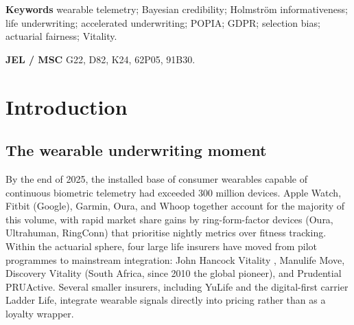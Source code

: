 \documentclass[11pt,a4paper]{article}
\let\origsection\section
\renewcommand{\section}{\clearpage\origsection}
\theoremstyle{ia}
\newcommand{\1}{\mathbf{1}}
\begin{document}
\par\vspace{4pt}\noindent{\color{iarule}\rule{\textwidth}{0.3pt}}\par\vspace{6pt}

\noindent
{\sffamily\footnotesize\color{iadark}\textbf{Keywords}}\quad
{\footnotesize wearable telemetry; Bayesian credibility; Holmstr\"om
informativeness; life underwriting; accelerated underwriting; POPIA;
GDPR; selection bias; actuarial fairness; Vitality.}

\par\vspace{3pt}
\noindent
{\sffamily\footnotesize\color{iadark}\textbf{JEL / MSC}}\quad
{\footnotesize G22, D82, K24, 62P05, 91B30.}

\par\vspace{8pt}

\clearpage
\tableofcontents




\section{Introduction}\label{sec:intro}

\subsection{The wearable underwriting moment}\label{ss:moment}

By the end of 2025, the installed base of consumer wearables capable
of continuous biometric telemetry had exceeded 300 million devices.
Apple Watch, Fitbit (Google), Garmin, Oura, and Whoop together account
for the majority of this volume, with rapid market share gains by
ring-form-factor devices (Oura, Ultrahuman, RingConn) that prioritise
nightly metrics over fitness tracking. Within the actuarial sphere,
four large life insurers have moved from pilot programmes to mainstream
integration: John Hancock Vitality \citep{Hancock2018}, Manulife Move,
Discovery Vitality (South Africa, since 2010 the global pioneer), and
Prudential PRUActive. Several smaller insurers, including YuLife and
the digital-first carrier Ladder Life, integrate wearable signals
directly into pricing rather than as a loyalty wrapper.
\end{document}
